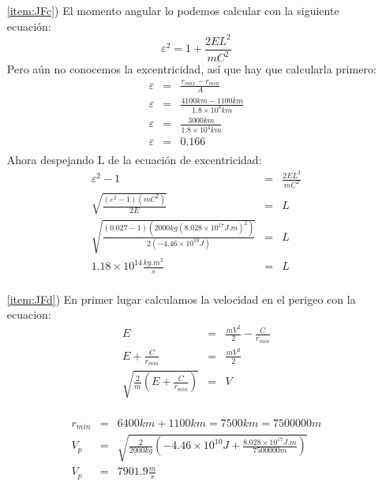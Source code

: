 \documentclass[12pt]{article}
\begin{document}
\begin{enumerate}
\begin{itemize}
  
  
\item[\ref{item:JFc})]
El momento angular lo podemos calcular con la siguiente ecuación:\\
\begin{equation}
\varepsilon^2=1+\frac{2 E L^2}{m C^2}
\end{equation}
Pero aún no conocemos la excentricidad, así que hay que calcularla primero:\\
\begin{eqnarray}
\varepsilon&=&\frac{r_{max}-r_{min}}{A}\nonumber\\
\varepsilon&=&\frac{4100 km - 1100 km}{1.8\times10^4 km}\nonumber\\
\varepsilon&=&\frac{3000 km}{1.8\times10^4 km}\nonumber\\
\varepsilon&=&0.166\\
\nonumber
\end{eqnarray}
Ahora despejando L de la ecuación de excentricidad:\\
\begin{eqnarray}
\varepsilon^2-1&=&\frac{2 E L^2}{m C^2}\nonumber\\
\sqrt{\frac{(\varepsilon^2-1)(m C^2)}{2 E}}&=&L\nonumber\\
\sqrt{\frac{(0.027-1)(2000 kg (8.028\times10^{17} J.m)^2)}{2(-4.46\times10^{10} J)}}&=&L\nonumber\\
1.18\times10^{14} \frac{kg.m^2}{s}&=&L\\
\nonumber
\end{eqnarray} 

  
\item[\ref{item:JFd})] 
En primer lugar calculamos la velocidad en el perigeo con la ecuacion:\\

\begin{eqnarray}
E&=&\frac{m V^2}{2}-\frac{C}{r_{min}}\nonumber\\
E+\frac{C}{r_{min}}&=&\frac{m V^2}{2}\nonumber\\
\sqrt{\frac{2}{m} \left(E+\frac{C}{r_{min}}\right)}&=&V\\
\nonumber
\end{eqnarray}

\begin{eqnarray}
 r_{min}&=&6400 km + 1100 km = 7500 km = 7500000 m\nonumber\\ 
 V_p&=&\sqrt{\frac{2}{2000 kg}\left(-4.46\times10^{10} J + \frac{8.028\times10^{17} J.m}{7500000 m}\right)}\nonumber\\
 V_p&=&7901.9 \frac{m}{s}\\
 \nonumber
\end{eqnarray}


\end{itemize}
\end{enumerate}
\end{document}
